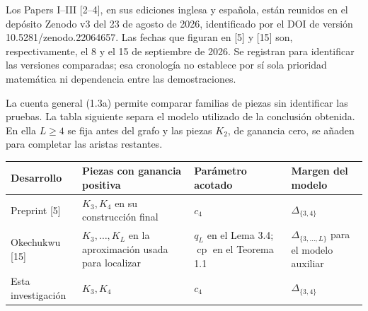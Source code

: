 \documentclass[spanish,11pt,a4paper]{article}
\newcounter{none}
\begin{document}
Los Papers I--III {[}2--4{]}, en sus ediciones inglesa y española, están reunidos en el depósito Zenodo v3 del 23 de agosto de 2026, identificado por el DOI de versión {\ttfamily\small 10.\discretionary{\hbox{\ensuremath{\hookrightarrow}}}{}{}5281/\discretionary{\hbox{\ensuremath{\hookrightarrow}}}{}{}zenodo.\discretionary{\hbox{\ensuremath{\hookrightarrow}}}{}{}22064657}. Las fechas que figuran en {[}5{]} y {[}15{]} son, respectivamente, el 8 y el 15 de septiembre de 2026. Se registran para identificar las versiones comparadas; esa cronología no establece por sí sola prioridad matemática ni dependencia entre las demostraciones.

La cuenta general (1.3a) permite comparar familias de piezas sin identificar las pruebas. La tabla siguiente separa el modelo utilizado de la conclusión obtenida. En ella \(L\ge4\) se fija antes del grafo y las piezas \(K_2\), de ganancia cero, se añaden para completar las aristas restantes.


{\def\LTcaptype{none} %
\begin{longtable}[c]{@{}
  >{\raggedright\arraybackslash}p{}
  >{\raggedright\arraybackslash}p{}
  >{\raggedright\arraybackslash}p{}
  >{\raggedright\arraybackslash}p{}@{}}
\toprule\noalign{}
\begin{minipage}[b]{\linewidth}\raggedright
Desarrollo
\end{minipage} & \begin{minipage}[b]{\linewidth}\raggedright
Piezas con ganancia positiva
\end{minipage} & \begin{minipage}[b]{\linewidth}\raggedright
Parámetro acotado
\end{minipage} & \begin{minipage}[b]{\linewidth}\raggedright
Margen del modelo
\end{minipage} \\
\midrule\noalign{}
\endhead
\bottomrule\noalign{}
\endlastfoot
Preprint {[}5{]} & \(K_3,K_4\) en su construcción final & \(c_4\) & \(\Delta_{\{3,4\}}\) \\
Okechukwu {[}15{]} & \(K_3,\ldots,K_L\) en la aproximación usada para localizar & \(q_L\) en el Lema 3.4; \(\operatorname{cp}\) en el Teorema 1.1 & \(\Delta_{\{3,\ldots,L\}}\) para el modelo auxiliar \\
Esta investigación & \(K_3,K_4\) & \(c_4\) & \(\Delta_{\{3,4\}}\) \\
\end{longtable}
}
\end{document}
